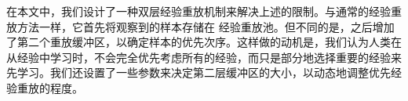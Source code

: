 
在本文中，我们设计了一种双层经验重放机制来解决上述的限制。与通常的经验重放方法一样，它首先将观察到的样本存储在
经验重放池。但不同的是，之后增加了第二个重放缓冲区，以确定样本的优先次序。这样做的动机是，我们认为人类在从经验中学习时，不会完全优先考虑所有的经验，而只是部分地选择重要的经验来先学习。我们还设置了一些参数来决定第二层缓冲区的大小，以动态地调整优先经验重放的程度。




